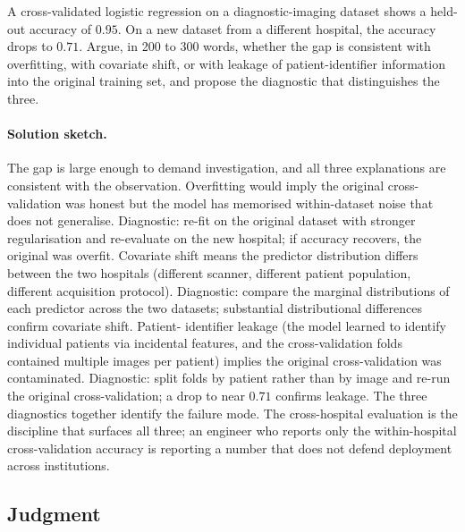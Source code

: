 \begin{exercise}
A cross-validated logistic regression on a diagnostic-imaging
dataset shows a held-out accuracy of $0.95$. On a new dataset from
a different hospital, the accuracy drops to $0.71$. Argue, in 200
to 300 words, whether the gap is consistent with overfitting,
with covariate shift, or with leakage of patient-identifier
information into the original training set, and propose the
diagnostic that distinguishes the three.

\paragraph{Solution sketch.} The gap is large enough to demand
investigation, and all three explanations are consistent with
the observation. Overfitting would imply the original
cross-validation was honest but the model has memorised
within-dataset noise that does not generalise. Diagnostic:
re-fit on the original dataset with stronger regularisation and
re-evaluate on the new hospital; if accuracy recovers, the
original was overfit. Covariate shift means the predictor
distribution differs between the two hospitals (different
scanner, different patient population, different acquisition
protocol). Diagnostic: compare the marginal distributions of
each predictor across the two datasets; substantial
distributional differences confirm covariate shift. Patient-
identifier leakage (the model learned to identify individual
patients via incidental features, and the cross-validation folds
contained multiple images per patient) implies the original
cross-validation was contaminated. Diagnostic: split folds by
patient rather than by image and re-run the original
cross-validation; a drop to near $0.71$ confirms leakage. The
three diagnostics together identify the failure mode. The
cross-hospital evaluation is the discipline that surfaces all
three; an engineer who reports only the within-hospital
cross-validation accuracy is reporting a number that does not
defend deployment across institutions.
\end{exercise}

\subsection*{Judgment}


